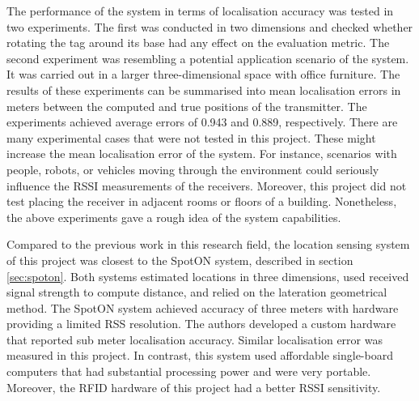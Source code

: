 The performance of the system in terms of localisation accuracy was tested in two experiments. The first was conducted in two dimensions and checked whether rotating the tag around its base had any effect on the evaluation metric. The second experiment was resembling a potential application scenario of the system. It was carried out in a larger three-dimensional space with office furniture. The results of these experiments can be summarised into mean localisation errors in meters between the computed and true positions of the transmitter. The experiments achieved average errors of 0.943 and 0.889, respectively. There are many experimental cases that were not tested in this project. These might increase the mean localisation error of the system. For instance, scenarios with people, robots, or vehicles moving through the environment could seriously influence the RSSI measurements of the receivers. Moreover, this project did not test placing the receiver in adjacent rooms or floors of a building. Nonetheless, the above experiments gave a rough idea of the system capabilities.

Compared to the previous work in this research field, the location sensing system of this project was closest to the SpotON system, described in section \ref{sec:spoton}. Both systems estimated locations in three dimensions, used received signal strength to compute distance, and relied on the lateration geometrical method. The SpotON system achieved accuracy of three meters with hardware providing a limited RSS resolution. The authors developed a custom hardware that reported sub meter localisation accuracy. Similar localisation error was measured in this project. In contrast, this system used affordable single-board computers that had substantial processing power and were very portable. Moreover, the RFID hardware of this project had a better RSSI sensitivity.

